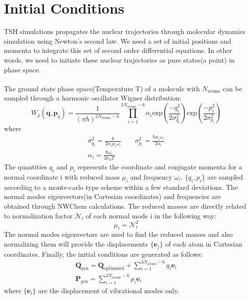 \section{Initial Conditions}
    TSH simulations propagates the nuclear trajectories through molecular dynamics simulation using Newton's second law. We need a set of initial positions and momenta to integrate this set of second order differential equations. In other words, we need to initiate these nuclear trajectories as pure states(a point) in phase space. \\ \\
    The ground state phase space(Temperature T) of a molecule with $N_{\text{atoms}}$ can be sampled through a harmonic oscillator Wigner distribution:
    \begin{equation}\label{wigner_distribution}
        W_{\hat{\rho}}(\mathbf{q},\mathbf{p}_q) = \frac{1}{(\pi\hbar)^{3N_{\text{atoms}}-6}}\prod_{i=1}^{3N_{\text{atoms}}-6}\alpha_i\text{exp}\left(\frac{-q_i^2}{2\sigma_{q_i}^2}\right)\text{exp}\left(\frac{-p_i^2}{2\sigma_{p_i}^2}\right)
    \end{equation}
    where 
    \begin{equation}
    \begin{gathered}
        \sigma^2_{q_i} = \frac{\hbar}{2\alpha_i\mu_i\omega_i} \qquad
        \sigma^2_{p_i} = \frac{\hbar\mu_i\omega_i}{2\alpha_i} \\ 
        \alpha_i = \frac{\hbar \omega_i}{2k_BT}
    \end{gathered}
    \end{equation}
    The quantities $q_i$ and $p_i$ represents the coordinate and conjugate momenta for a normal coordinate i with reduced mass $\mu_i$ and frequency $\omega_i$. $\{q_i,p_i\}$ are sampled according to a monte-carlo type scheme within a few standard deviations. The normal modes eigenvectors(in Cartesian coordinates) and frequencies are obtained through NWChem calculations. 
    The reduced masses are directly related to normalization factor $\mathcal{N}_i$ of each normal mode i in the following way\cite{Wilson_1955,gaussian_vib}:
    \begin{equation}
        \mu_i = \mathcal{N}_i^2
    \end{equation}
    The normal modes eigenvectors are used to find the reduced masses and also normalizing them will provide the displacements $\{\mathbf{e}_j\}$ of each atom in Cartesian coordinates. Finally, the initial conditions are generated as follows:
    \begin{gather}
        \mathbf{Q}_{\text{gen}} = \mathbf{Q}_{\text{optimized}} + \sum_{i=1}^{3N_{\text{atoms}}-6}q_i\mathbf{e}_i  \\ 
        \mathbf{P}_{\text{gen}} = \sum_{i=1}^{3N_{\text{atoms}}-6}p_i\mathbf{e}_i
    \end{gather}
    where $\{\mathbf{e}_i\}$ are the displacement of vibrational modes only.

